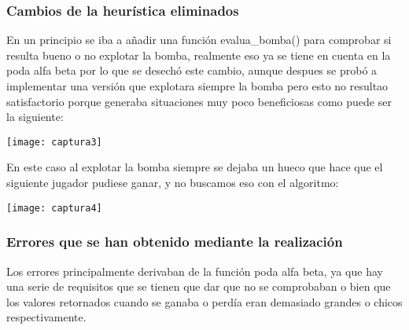 \documentclass[a4paper, 10pt]{article} %
\begin{document}
\subsubsection{Cambios de la heurística eliminados}
En un principio se iba a añadir una función evalua\_bomba() para comprobar si resulta bueno o no explotar la bomba, realmente eso ya se tiene en cuenta en la poda alfa beta por lo que se desechó este cambio, aunque despues se probó a implementar una versión que explotara siempre la bomba pero esto no resultao satisfactorio porque generaba situaciones muy poco beneficiosas como puede ser la siguiente:
\begin{center}
\texttt{[image: captura3]}
\end{center}
En este caso al explotar la bomba siempre se dejaba un hueco que hace que el siguiente jugador pudiese ganar, y no buscamos eso con el algoritmo:
\begin{center}
\texttt{[image: captura4]} 
\end{center}


\subsubsection{Errores que se han obtenido mediante la realización}
Los errores principalmente derivaban de la función poda alfa beta, ya que hay una serie de requisitos que se tienen que dar que no se comprobaban o bien que los valores retornados cuando se ganaba o perdía eran demasiado grandes o chicos respectivamente. 
\end{document}
